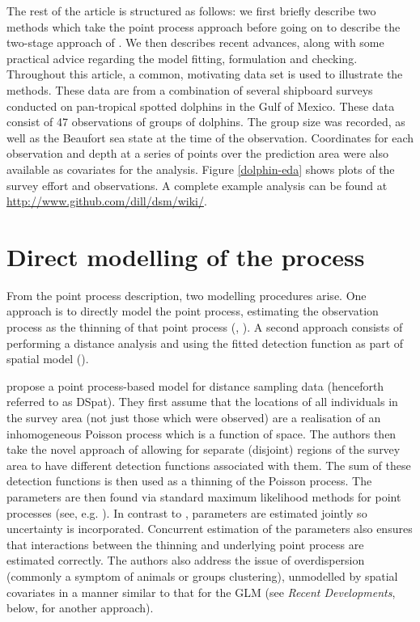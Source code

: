 \documentclass[a4paper,12pt]{article}
\begin{document}
The rest of the article is structured as follows: we first briefly describe two methods which take the point process approach before going on to describe the two-stage approach of \cite{Hedley:2004et}. We then describes recent advances, along with some practical advice regarding the model fitting, formulation and checking. Throughout this article, a common, motivating data set is used to illustrate the methods. These data are from a combination of several shipboard surveys conducted on pan-tropical spotted dolphins in the Gulf of Mexico. These data consist of 47 observations of groups of dolphins. The group size was recorded, as well as the Beaufort sea state at the time of the observation. Coordinates for each observation and depth at a series of points over the prediction area were also available as covariates for the analysis. Figure \ref{dolphin-eda} shows plots of the survey effort and observations. A complete example analysis can be found at \url{http://www.github.com/dill/dsm/wiki/}.

\section*{Direct modelling of the process}
\label{s:direct}

From the point process description, two modelling procedures arise. One approach is to directly model the point process, estimating the observation process as the thinning of that point process (\cite{Niemi:2010kx}, \cite{Johnson:2010gf}). A second approach consists of performing a distance analysis and using the fitted detection function as part of spatial model (\cite{Hedley:2004et}).

\cite{Johnson:2010gf} propose a point process-based model for distance sampling data (henceforth referred to as DSpat). They first assume that the locations of all individuals in the survey area (not just those which were observed) are a realisation of an inhomogeneous Poisson process which is a function of space. The authors then take the novel approach of allowing for separate (disjoint) regions of the survey area to have different detection functions associated with them. The sum of these detection functions is then used as a thinning of the Poisson process. The parameters are then found via standard maximum likelihood methods for point processes (see, e.g. \cite{Baddeley:2000to}). In contrast to \cite{Hedley:2004et}, parameters are estimated jointly so uncertainty is incorporated. Concurrent estimation of the parameters also ensures that interactions between the thinning and underlying point process are estimated correctly. The authors also address the issue of overdispersion (commonly a symptom of animals or groups clustering), unmodelled by spatial covariates in a manner similar to that for the GLM (see \textit{Recent Developments}, below, for another approach). 
\end{document}
